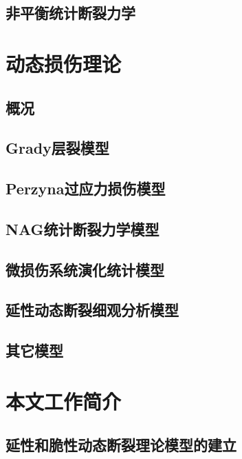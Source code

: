 \documentclass[degree=postdoc]{thuthesis}
\begin{document}
\clearpage
\setcounter{page}{24}
\subsection{非平衡统计断裂力学}

\clearpage
\setcounter{page}{25}
\section{动态损伤理论}
\subsection{概况}

\clearpage
\setcounter{page}{27}
\subsection{Grady层裂模型}

\clearpage
\setcounter{page}{29}
\subsection{Perzyna过应力损伤模型}

\clearpage
\setcounter{page}{30}
\subsection{NAG统计断裂力学模型}

\clearpage
\setcounter{page}{33}
\subsection{微损伤系统演化统计模型}

\clearpage
\setcounter{page}{36}
\subsection{延性动态断裂细观分析模型}

\clearpage
\setcounter{page}{38}
\subsection{其它模型}

\clearpage
\setcounter{page}{39}
\section{本文工作简介}
\subsection{延性和脆性动态断裂理论模型的建立}
\end{document}
